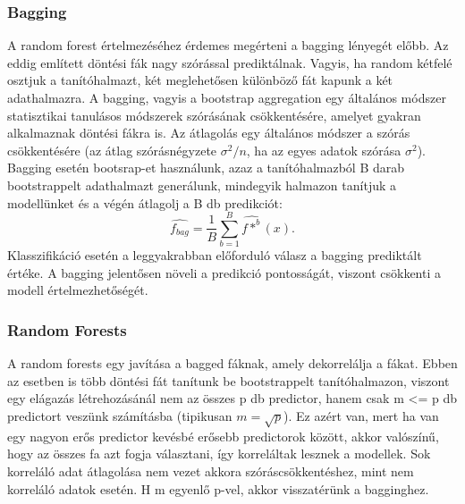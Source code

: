\documentclass[12pt]{article}
\theoremstyle{plain}
\begin{document}
\subsubsection{Bagging}
A random forest értelmezéséhez érdemes megérteni a bagging lényegét előbb. Az eddig említett döntési fák nagy szórással prediktálnak. Vagyis, ha random kétfelé osztjuk a tanítóhalmazt, két meglehetősen különböző fát kapunk a két adathalmazra. A bagging, vagyis a bootstrap aggregation egy általános módszer statisztikai tanulásos módszerek szórásának csökkentésére, amelyet gyakran alkalmaznak döntési fákra is. Az átlagolás egy általános módszer a szórás csökkentésére (az átlag szórásnégyzete $\sigma^2/n$, ha az egyes adatok szórása $\sigma^2$). Bagging esetén bootsrap-et használunk, azaz a tanítóhalmazból B darab bootstrappelt adathalmazt generálunk, mindegyik halmazon tanítjuk a modellünket és a végén átlagolj a B db predikciót: 
$$ \hat{f_{bag}} = \frac{1}{B} \sum_{b=1}^B\hat{f*^b}(x). $$
Klasszifikáció esetén a leggyakrabban előforduló válasz a bagging prediktált értéke. A bagging jelentősen növeli a predikció pontosságát, viszont csökkenti a modell értelmezhetőségét. 

\subsubsection{Random Forests}
A random forests egy javítása a bagged fáknak, amely dekorrelálja a fákat. Ebben az esetben is több döntési fát tanítunk be bootstrappelt tanítóhalmazon, viszont egy elágazás létrehozásánál nem az összes p db predictor, hanem csak m <= p db predictort veszünk számításba (tipikusan $m=\sqrt{p}$). Ez azért van, mert ha van egy nagyon erős predictor kevésbé erősebb predictorok között, akkor valószínű, hogy az összes fa azt fogja választani, így korreláltak lesznek a modellek. Sok korreláló adat átlagolása nem vezet akkora szóráscsökkentéshez, mint nem korreláló adatok esetén. H m egyenlő p-vel, akkor visszatérünk a  bagginghez.
\end{document}
